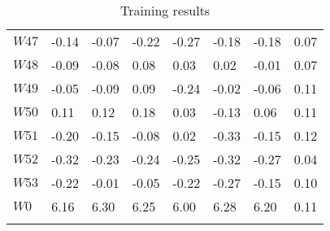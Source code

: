 \documentclass{article}
\begin{document}
\begin{longtable}{llllllll}
	$W47$	&	-0.14	&	-0.07	&	-0.22	&	-0.27	&	-0.18	&	-0.18	&	0.07	\\
	$W48$	&	-0.09	&	-0.08	&	0.08	&	0.03	&	0.02	&	-0.01	&	0.07	\\
	$W49$	&	-0.05	&	-0.09	&	0.09	&	-0.24	&	-0.02	&	-0.06	&	0.11	\\
	$W50$	&	0.11	&	0.12	&	0.18	&	0.03	&	-0.13	&	0.06	&	0.11	\\
	$W51$	&	-0.20	&	-0.15	&	-0.08	&	0.02	&	-0.33	&	-0.15	&	0.12	\\
	$W52$	&	-0.32	&	-0.23	&	-0.24	&	-0.25	&	-0.32	&	-0.27	&	0.04	\\
	$W53$	&	-0.22	&	-0.01	&	-0.05	&	-0.22	&	-0.27	&	-0.15	&	0.10	\\
	$W0$	&	6.16	&	6.30	&	6.25	&	6.00	&	6.28	&	6.20	&	0.11	\\
    \bottomrule
    \caption{Training results}
	\label{tab:acc}
\end{longtable}
\end{document}
